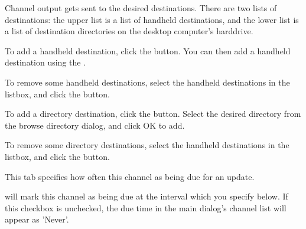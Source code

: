 
Channel output gets sent to the desired destinations. There are two lists of
destinations: the upper list is a list of handheld destinations, and the lower
list is a list of destination directories on the desktop computer's harddrive.

To add a handheld destination, click the 
button. You can then add a handheld destination using the
\helpignore{\ref{sec:pd-handheld-dest-dialog}}
.

To remove some handheld destinations, select the handheld destinations in the 
listbox, and click the  button.

To add a directory destination, click the 
 button. Select the desired directory 
from the browse directory dialog, and click OK to add.

To remove some directory destinations, select the handheld destinations in the listbox,
and click the  button.


This tab specifies how often this channel as being due for an update.

 will 
mark this channel as being due at the interval which you specify below. If 
this checkbox is unchecked, the due time in the main dialog's channel list 
will appear as 'Never'.

